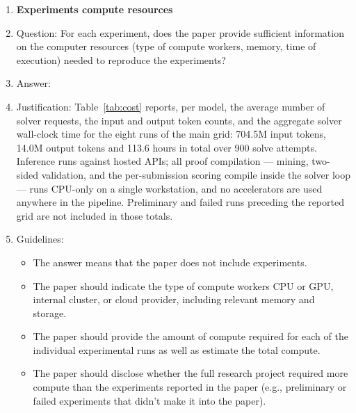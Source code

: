\begin{enumerate}
\item {\bf Experiments compute resources}
    \item[] Question: For each experiment, does the paper provide sufficient information on the computer resources (type of compute workers, memory, time of execution) needed to reproduce the experiments?
    \item[] Answer: \answerYes{}
    \item[] Justification: Table~\ref{tab:cost} reports, per model, the average number of solver requests, the input and output token counts, and the aggregate solver wall-clock time for the eight runs of the main grid: 704.5M input tokens, 14.0M output tokens and 113.6 hours in total over 900 solve attempts. Inference runs against hosted APIs; all proof compilation --- mining, two-sided validation, and the per-submission scoring compile inside the solver loop --- runs CPU-only on a single workstation, and no accelerators are used anywhere in the pipeline. Preliminary and failed runs preceding the reported grid are not included in those totals.
    \item[] Guidelines:
    \begin{itemize}
        \item The answer \answerNA{} means that the paper does not include experiments.
        \item The paper should indicate the type of compute workers CPU or GPU, internal cluster, or cloud provider, including relevant memory and storage.
        \item The paper should provide the amount of compute required for each of the individual experimental runs as well as estimate the total compute. 
        \item The paper should disclose whether the full research project required more compute than the experiments reported in the paper (e.g., preliminary or failed experiments that didn't make it into the paper). 
    \end{itemize}
    

\end{enumerate}

